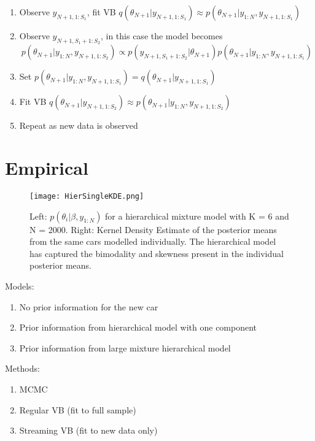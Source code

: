 \documentclass[12pt,a4paper]{article}\usepackage[]{graphicx}\usepackage[]{color}
\begin{document}
\begin{itemize}
\begin{enumerate}
\item Observe $y_{N+1, 1:S_1}$, fit VB $q(\theta_{N+1} | y_{N+1, 1:S_1}) \approx p(\theta_{N+1} | y_{1:N}, y_{N+1, 1:S_1})$
\item Observe $y_{N+1, S_1+1:S_2}$, in this case the model becomes
\begin{equation}
p(\theta_{N+1} | y_{1:N}, y_{N+1, 1:S_2}) \propto p(y_{N+1, S_1+1:S_2} | \theta_{N+1})p(\theta_{N+1} |  y_{1:N}, y_{N+1, 1:S_1})
\end{equation}
\item Set $p(\theta_{N+1} |  y_{1:N}, y_{N+1, 1:S_1}) = q(\theta_{N+1} | y_{N+1, 1:S_1})$
\item Fit VB  $q(\theta_{N+1} | y_{N+1, 1:S_2}) \approx p(\theta_{N+1} | y_{1:N}, y_{N+1, 1:S_2})$
\item Repeat as new data is observed
\end{enumerate}
\end{itemize}

\section{Empirical}

\begin{figure}[h]
\centering
\texttt{[image: HierSingleKDE.png]}
\caption{Left: $p(\theta_i | \beta, y_{1:N})$ for a hierarchical mixture model with K = 6 and N = 2000. Right: Kernel Density Estimate of the posterior means from the same cars modelled individually. The hierarchical model has captured the bimodality and skewness present in the individual posterior means.}
\label{fig:HierSingleKDE}
\end{figure}

Models:
\begin{enumerate}
\item No prior information for the new car
\item Prior information from hierarchical model with one component
\item Prior information from large mixture hierarchical model
\end{enumerate}

Methods:
\begin{enumerate}
\item MCMC
\item Regular VB (fit to full sample)
\item Streaming VB (fit to new data only)
\end{enumerate}
\end{document}
